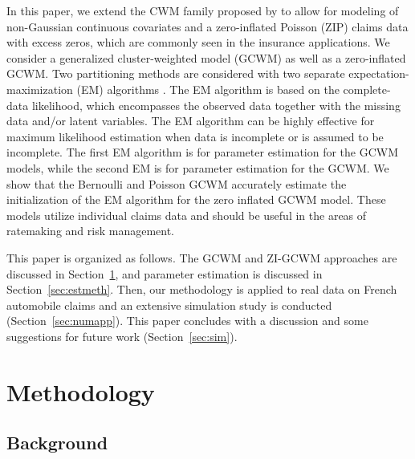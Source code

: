 \documentclass[12pt,letterpaper]{article}
\numberwithin{equation}{section}
\numberwithin{equation}{section}
\numberwithin{equation}{section}
\begin{document}
In this paper, we extend the CWM family proposed by \cite{Ingrassia+Punzo+Vittadini+Minotti:2015} to allow for modeling of non-Gaussian continuous covariates and a zero-inflated Poisson (ZIP) claims data with excess zeros, which are commonly seen in the insurance applications. We consider a generalized cluster-weighted model (GCWM) as well as a zero-inflated GCWM. Two partitioning methods are considered with two separate expectation-maximization (EM) algorithms \citep{Dempster+Laird+Rubin:1977}. The EM algorithm is based on the complete-data likelihood, which encompasses the observed data together with the missing data and/or latent variables. The EM algorithm can be highly effective for maximum likelihood estimation when data is incomplete or is assumed to be incomplete. The first EM algorithm is for parameter estimation for the GCWM models, while the second EM is for parameter estimation for the GCWM. We show that the Bernoulli and Poisson GCWM accurately estimate the initialization of the EM algorithm for the zero inflated GCWM model. These models utilize individual claims data and should be useful in the areas of ratemaking and risk management.

This paper is organized as follows. The GCWM and ZI-GCWM approaches are discussed in Section~\ref{sec:model}, and parameter estimation is discussed in Section~\ref{sec:estmeth}. Then, our methodology is applied to real data on French automobile claims and an extensive simulation study is conducted (Section~\ref{sec:numapp}). This paper concludes with a discussion and some suggestions for future work (Section~\ref{sec:sim}).


\section{Methodology}\label{sec:model}

\subsection{Background}
\end{document}
